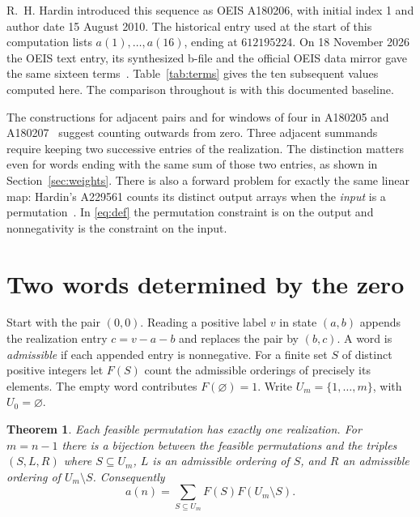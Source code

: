 \documentclass[11pt]{article}
\newtheorem{theorem}{Theorem}[section]
\begin{document}
R.~H. Hardin introduced this sequence as OEIS A180206, with initial
index 1 and author date 15 August 2010. The historical entry used at
the start of this computation lists \(a(1),\ldots,a(16)\), ending at
\(612195224\). On 18 November 2026 the OEIS text entry, its synthesized
b-file and the official OEIS data mirror gave the same sixteen terms~\cite{hardin}. Table~\ref{tab:terms} gives
the ten subsequent values computed here. The comparison throughout is with
this documented baseline.

The constructions for adjacent pairs and for windows of four in
A180205 and A180207~\cite{hardintwo,hardinfour,two,four} suggest counting outwards
from zero. Three adjacent summands require keeping two successive entries
of the realization. The distinction matters even for words ending with
the same sum of those two entries, as shown in Section~\ref{sec:weights}.
There is also a forward problem for exactly the same linear map:
Hardin's A229561 counts its distinct output arrays when the \emph{input}
is a permutation~\cite{forward}. In \eqref{eq:def} the permutation
constraint is on the output and nonnegativity is the constraint on the input.

\section{Two words determined by the zero}\label{sec:zero}

Start with the pair \((0,0)\). Reading a positive label \(v\) in state
\((a,b)\) appends the realization entry \(c=v-a-b\) and replaces the pair
by \((b,c)\). A word is \emph{admissible} if each appended entry is
nonnegative. For a finite set \(S\) of distinct positive integers let \(F(S)\)
count the admissible orderings of precisely its elements. The empty word
contributes \(F(\varnothing)=1\). Write \(U_m=\{1,\ldots,m\}\), with
\(U_0=\varnothing\).

\begin{theorem}\label{thm:split}
Each feasible permutation has exactly one realization. For \(m=n-1\)
there is a bijection between the feasible permutations and the triples
\((S,L,R)\) where \(S\subseteq U_m\), \(L\) is an admissible ordering of
\(S\), and \(R\) an admissible ordering of \(U_m\setminus S\). Consequently
\begin{equation}
 a(n)=\sum_{S\subseteq U_m}F(S)F(U_m\setminus S).
 \label{eq:split}
\end{equation}
\end{theorem}
\end{document}
